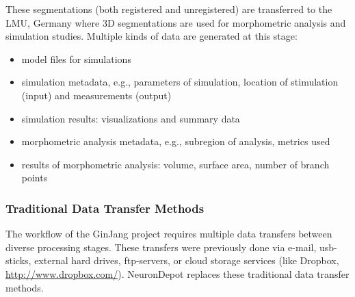 \documentclass{frontiersSCNS} %
\begin{document}
These segmentations  (both registered and unregistered) are transferred to the
LMU, Germany where 3D segmentations are used for morphometric analysis and
simulation studies. Multiple kinds of data are generated at this
stage:

\begin{itemize}
\item model files for simulations
\item simulation metadata, e.g., parameters of simulation, location of
    stimulation (input) and measurements (output)
\item simulation results: visualizations and summary data
\item morphometric analysis metadata, e.g., subregion of analysis, metrics used
\item results of morphometric analysis: volume, surface area, number of branch points
\end{itemize}


\subsubsection{Traditional Data Transfer Methods}

The workflow of the GinJang project requires multiple data transfers between
diverse processing stages. These transfers were previously done via e-mail,
usb-sticks, external hard drives, ftp-servers, or cloud storage services (like
Dropbox, \url{http://www.dropbox.com/}). NeuronDepot replaces these traditional data transfer methods.


\end{document}

